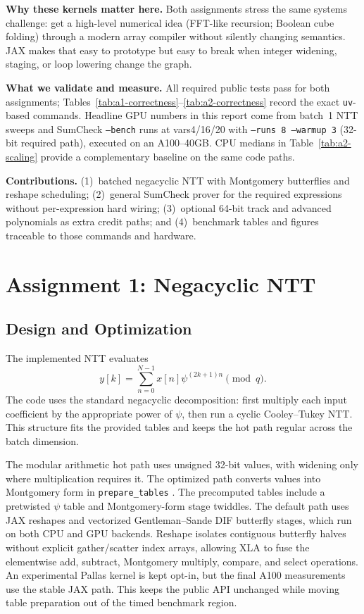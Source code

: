 \documentclass[conference]{IEEEtran}
\begin{document}
\textbf{Why these kernels matter here.} Both assignments stress the same
systems challenge: get a high-level numerical idea (FFT-like recursion;
Boolean cube folding) through a modern array compiler without silently changing
semantics. JAX \cite{jax2018} makes that easy to prototype but easy to break when integer
widening, staging, or loop lowering change the graph.

\textbf{What we validate and measure.} All required public tests pass for both
assignments; Tables~\ref{tab:a1-correctness}--\ref{tab:a2-correctness} record
the exact \texttt{uv}-based commands. Headline GPU numbers in this report come
from batch~1 NTT sweeps and SumCheck \texttt{--bench} runs at vars4/16/20 with
\texttt{--runs 8 --warmup 3} (32-bit required path), executed on an A100--40GB.
CPU medians in Table~\ref{tab:a2-scaling} provide a complementary baseline on
the same code paths.

\textbf{Contributions.} (1)~batched negacyclic NTT with Montgomery butterflies
and reshape scheduling; (2)~general SumCheck prover for the required
expressions without per-expression hard wiring; (3)~optional 64-bit track and
advanced polynomials as extra credit paths; and (4)~benchmark tables and
figures traceable to those commands and hardware.

\section{Assignment 1: Negacyclic NTT}
\subsection{Design and Optimization}
The implemented NTT evaluates
\begin{equation}
y[k] = \sum_{n=0}^{N-1} x[n]\psi^{(2k+1)n} \pmod q.
\end{equation}
The code uses the standard negacyclic decomposition: first multiply each input
coefficient by the appropriate power of $\psi$, then run a cyclic
Cooley--Tukey NTT. This structure fits the provided tables and keeps the hot
path regular across the batch dimension.

The modular arithmetic hot path uses unsigned 32-bit values, with widening only
where multiplication requires it. The optimized path converts values into
Montgomery form in \texttt{prepare\_tables} \cite{montgomery1985}. The precomputed tables include a
pretwisted $\psi$ table and Montgomery-form stage twiddles. The default path
uses JAX reshapes and vectorized Gentleman--Sande DIF butterfly stages, which
run on both CPU and GPU backends. Reshape isolates contiguous butterfly halves
without explicit gather/scatter index arrays, allowing XLA to fuse the
elementwise add, subtract, Montgomery multiply, compare, and select operations.
An experimental Pallas kernel is kept opt-in, but the final A100 measurements
use the stable JAX path. This keeps the public API unchanged while moving table
preparation out of the timed benchmark region.
\end{document}
